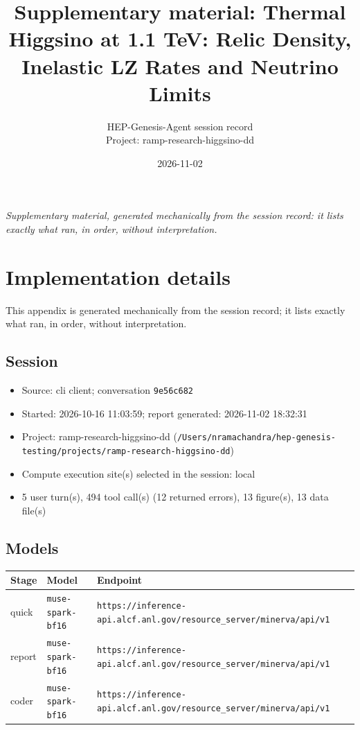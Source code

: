 \documentclass[11pt,a4paper]{article}
\title{Supplementary material: Thermal Higgsino at 1.1 TeV: Relic Density, Inelastic LZ Rates and Neutrino Limits}
\author{HEP-Genesis-Agent session record \\ \small Project: ramp-research-higgsino-dd}
\date{2026-11-02}
\begin{document}
\maketitle
\noindent\textit{\small Supplementary material, generated mechanically from the session record: it lists exactly what ran, in order, without interpretation.}
\vspace{1em}



\appendix
\section{Implementation details}
\label{app:impl}
This appendix is generated mechanically from the session record; it lists exactly what ran, in order, without interpretation.
\subsection{Session}
\begin{itemize}
  \item Source: cli client; conversation \texttt{9e56c682}
  \item Started: 2026-10-16 11:03:59; report generated: 2026-11-02 18:32:31
  \item Project: ramp-research-higgsino-dd (\texttt{/\allowbreak{}Users/\allowbreak{}nramachandra/\allowbreak{}hep-genesis-testing/\allowbreak{}projects/\allowbreak{}ramp-research-higgsino-dd})
  \item Compute execution site(s) selected in the session: local
  \item 5 user turn(s), 494 tool call(s) (12 returned errors), 13 figure(s), 13 data file(s)
\end{itemize}
\subsection{Models}
\begin{longtable}{@{}p{}p{}p{}@{}}
\toprule Stage & Model & Endpoint \\ \midrule \endhead
quick & \texttt{muse-spark-bf16} & \texttt{https:\allowbreak{}/\allowbreak{}/\allowbreak{}inference-api.alcf.anl.gov/\allowbreak{}resource\_\allowbreak{}server/\allowbreak{}minerva/\allowbreak{}api/\allowbreak{}v1} \\
report & \texttt{muse-spark-bf16} & \texttt{https:\allowbreak{}/\allowbreak{}/\allowbreak{}inference-api.alcf.anl.gov/\allowbreak{}resource\_\allowbreak{}server/\allowbreak{}minerva/\allowbreak{}api/\allowbreak{}v1} \\
coder & \texttt{muse-spark-bf16} & \texttt{https:\allowbreak{}/\allowbreak{}/\allowbreak{}inference-api.alcf.anl.gov/\allowbreak{}resource\_\allowbreak{}server/\allowbreak{}minerva/\allowbreak{}api/\allowbreak{}v1} \\
\bottomrule\end{longtable}
\end{document}
